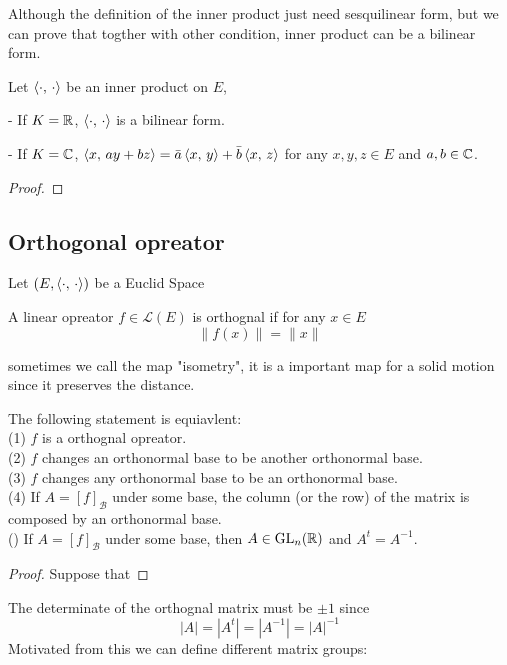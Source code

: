 \documentclass[en,geye,blue,normal,12pt]{elegantnote}
\begin{document}
Although the definition of the inner product just need sesquilinear form, but we can prove that togther with other condition, inner product can be a bilinear form.

\begin{proposition}
  Let \(\left\langle \cdot,\, \cdot \right\rangle\) be an inner product on \(E\),

  - If \(K = \mathbb{R}\), \(\left\langle \cdot,\, \cdot \right\rangle\) is a bilinear form.

  - If \(K = \mathbb{C}\), \(\left\langle x,\, ay+bz \right\rangle = \bar{a}\left\langle x,\, y \right\rangle+\bar{b}\left\langle x,\, z \right\rangle\) for any \(x,y,z \in  E\) and \(a,b \in \mathbb{C}\).

  \begin{proof}
    
  \end{proof}
\end{proposition}

\subsection{Orthogonal opreator}
Let \((E,\left\langle \cdot,\, \cdot \right\rangle)\) be a Euclid Space
\begin{definition}
  A linear opreator \(f \in \mathcal{L}(E)\) is orthognal if for any \(x \in E\)
  \[\|f(x)\| = \|x\|\]
\end{definition}

sometimes we call the map "isometry", it is a important map for a solid motion since it preserves the distance.

\begin{proposition}
  The following statement is equiavlent:
  \\(1) \(f\) is a orthognal opreator.
  \\(2) \(f\) changes an orthonormal base to be another orthonormal base.
  \\(3) \(f\) changes any orthonormal base to be an orthonormal base.
  \\(4) If \(A = [f]_\mathcal{B} \) under some base, the column (or the row) of the matrix is composed by an orthonormal base.
  \\() If \(A = [f]_\mathcal{B} \) under some base, then \(A \in \mathrm{GL}_n(\mathbb{R})\) and \(A^t = A^{-1}\).
  
  \begin{proof}
    Suppose that 
  \end{proof}
\end{proposition}

The determinate of the orthognal matrix must be \(\pm 1\) since
\[|A| = |A^t|=|A^{-1}| = |A|^{-1}\]
Motivated from this we can define different matrix groups:
\end{document}
